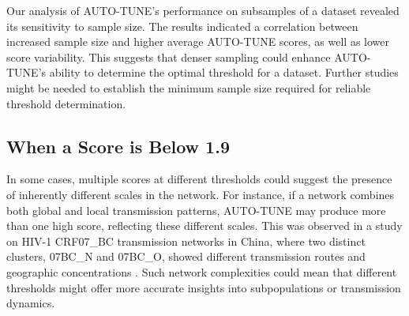 \documentclass[utf8]{FrontiersinHarvard} %
\newcommand{\TODO}[1]{{\color{red}{#1}}}
\begin{document}
\TODO{SAR -- This may also be dependent of the epidemiological context. In some
	scenarios, risk factors may overlap, and thus, separating for example PWID and
	MSM networks would not make sense.}

Our analysis of AUTO-TUNE's performance on subsamples of a dataset revealed its
sensitivity to sample size. The results indicated a correlation between
increased sample size and higher average AUTO-TUNE scores, as well as lower
score variability. This suggests that denser sampling could enhance AUTO-TUNE's
ability to determine the optimal threshold for a dataset. Further studies might
be needed to establish the minimum sample size required for reliable threshold
determination.

\subsection{When a Score is Below 1.9}

In some cases, multiple scores at different thresholds could suggest the
presence of inherently different scales in the network. For instance, if a
network combines both global and local transmission patterns, AUTO-TUNE may
produce more than one high score, reflecting these different scales. This was
observed in a study on HIV-1 CRF07\_BC transmission networks in China, where
two distinct clusters, 07BC\_N and 07BC\_O, showed different transmission
routes and geographic concentrations \citep{ding_characterizing_2022}. Such
network complexities could mean that different thresholds might offer more
accurate insights into subpopulations or transmission dynamics.
\end{document}

